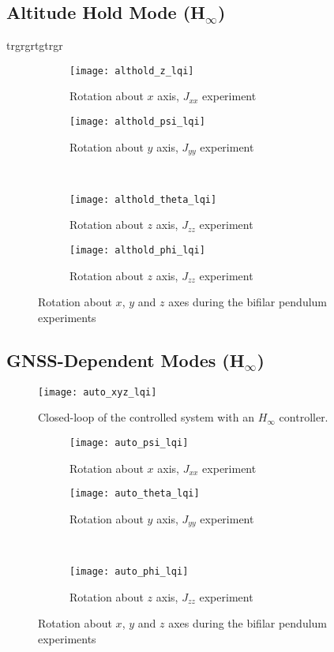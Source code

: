 \subsection{Altitude Hold Mode (H$_\infty$)}
trgrgrtgtrgr
\begin{figure}[H]
\begin{subfigure}{.5\linewidth}
\centering
\texttt{[image: althold\_z\_lqi]}
\caption{Rotation about $x$ axis, $J_{xx}$ experiment}
\label{fig:althold_z_lqi}
\end{subfigure}%
\begin{subfigure}{.5\linewidth}
\centering
\texttt{[image: althold\_psi\_lqi]}
\caption{Rotation about $y$ axis, $J_{yy}$ experiment}
\label{fig:althold_psi_lqi}
\end{subfigure}\\[1ex]
\begin{subfigure}{0.5\linewidth}
\centering
\texttt{[image: althold\_theta\_lqi]}
\caption{Rotation about $z$ axis, $J_{zz}$ experiment}
\label{fig:althold_theta_lqi}
\end{subfigure}
\begin{subfigure}{0.5\linewidth}
\centering
\texttt{[image: althold\_phi\_lqi]}
\caption{Rotation about $z$ axis, $J_{zz}$ experiment}
\label{fig:althold_phi_lqi}
\end{subfigure}
\caption{Rotation about $x$, $y$ and $z$ axes during the bifilar pendulum experiments}
\label{fig:althold_lqi}
\end{figure}

\subsection{GNSS-Dependent Modes (H$_\infty$)}
\begin{figure}[h]
	\begin{center}
	\texttt{[image: auto\_xyz\_lqi]}
	\caption{Closed-loop of the controlled system with an $H_{\infty}$ controller.}
	\label{fig:auto_xyz_lqi}
	\end{center}
	\end{figure}
	
\begin{figure}[H]
\begin{subfigure}{.5\linewidth}
\centering
\texttt{[image: auto\_psi\_lqi]}
\caption{Rotation about $x$ axis, $J_{xx}$ experiment}
\label{fig:auto_psi_lqi}
\end{subfigure}%
\begin{subfigure}{.5\linewidth}
\centering
\texttt{[image: auto\_theta\_lqi]}
\caption{Rotation about $y$ axis, $J_{yy}$ experiment}
\label{fig:auto_theta_lqi}
\end{subfigure}\\[1ex]
\begin{subfigure}{\linewidth}
\centering
\texttt{[image: auto\_phi\_lqi]}
\caption{Rotation about $z$ axis, $J_{zz}$ experiment}
\label{fig:auto_psi_lqi}
\end{subfigure}
\caption{Rotation about $x$, $y$ and $z$ axes during the bifilar pendulum experiments}
\label{fig:auto_lqi}
\end{figure}

